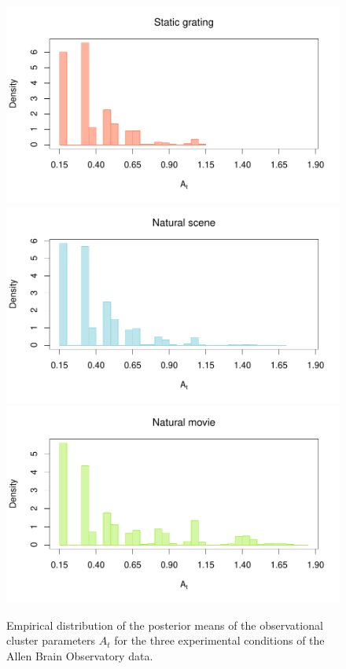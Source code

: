 \begin{figure}[h!]
	\centering
	\includegraphics[width = .8\textwidth]{_Images/ch3_hist1.pdf}\\
	\includegraphics[width = .8\textwidth]{_Images/ch3_hist2.pdf}\\
	\includegraphics[width = .8\textwidth]{_Images/ch3_hist3.pdf}
	\caption[Distribution of the observational cluster parameters for the three experimental conditions of the Allen Brain Observatory data.]{Empirical distribution of the posterior means of the observational cluster parameters $A_t$ for the three experimental conditions of the Allen Brain Observatory data.}
	\label{fig:A_distr}
\end{figure}



